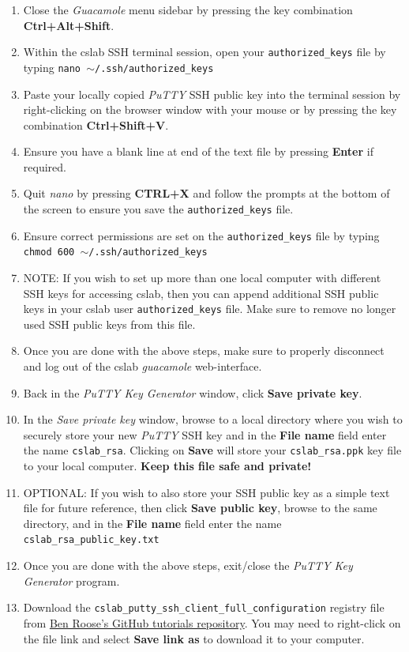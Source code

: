 \documentclass[12pt]{article}
\begin{document}
\begin{flushleft}
\begin{enumerate}
  \item Close the \textit{Guacamole} menu sidebar by pressing the key combination \textbf{Ctrl+Alt+Shift}.
  \item Within the cslab SSH terminal session, open your \texttt{authorized\_keys} file by typing \break
  \texttt{nano $\sim$/.ssh/authorized\_keys}
  \item Paste your locally copied \textit{PuTTY} SSH public key into the terminal session by right-clicking on the browser window with your mouse or by pressing the key combination \textbf{Ctrl+Shift+V}.
  \item Ensure you have a blank line at end of the text file by pressing \textbf{Enter} if required.
  \item Quit \textit{nano} by pressing \textbf{CTRL+X} and follow the prompts at the bottom of the screen to ensure you save the \texttt{authorized\_keys} file.
  \item Ensure correct permissions are set on the \texttt{authorized\_keys} file by typing \break
  \texttt{chmod 600 $\sim$/.ssh/authorized\_keys}
  \item NOTE: If you wish to set up more than one local computer with different SSH keys for accessing cslab, then you can append additional SSH public keys in your cslab user \texttt{authorized\_keys} file. Make sure to remove no longer used SSH public keys from this file.
  \item Once you are done with the above steps, make sure to properly disconnect and log out of the cslab \textit{guacamole} web-interface.
  \item Back in the \textit{PuTTY Key Generator} window, click \textbf{Save private key}.
  \item In the \textit{Save private key} window, browse to a local directory where you wish to securely store your new \textit{PuTTY} SSH key and in the \textbf{File name} field enter the name \texttt{cslab\_rsa}. Clicking on \textbf{Save} will store your \texttt{cslab\_rsa.ppk} key file to your local computer. \textbf{Keep this file safe and private!}
  \item OPTIONAL: If you wish to also store your SSH public key as a simple text file for future reference, then click \textbf{Save public key}, browse to the same directory, and in the \textbf{File name} field enter the name \texttt{cslab\_rsa\_public\_key.txt}
  \item Once you are done with the above steps, exit/close the \textit{PuTTY Key Generator} program.
  \item Download the \texttt{cslab\_putty\_ssh\_client\_full\_configuration} registry file from \href{https://github.com/benroose/tutorials/tree/master/cslab_tutorials/cslab_ssh_client_config_files}{Ben Roose's GitHub tutorials repository}. You may need to right-click on the file link and select \textbf{Save link as} to download it to your computer.

\end{enumerate}
\end{flushleft}
\end{document}
